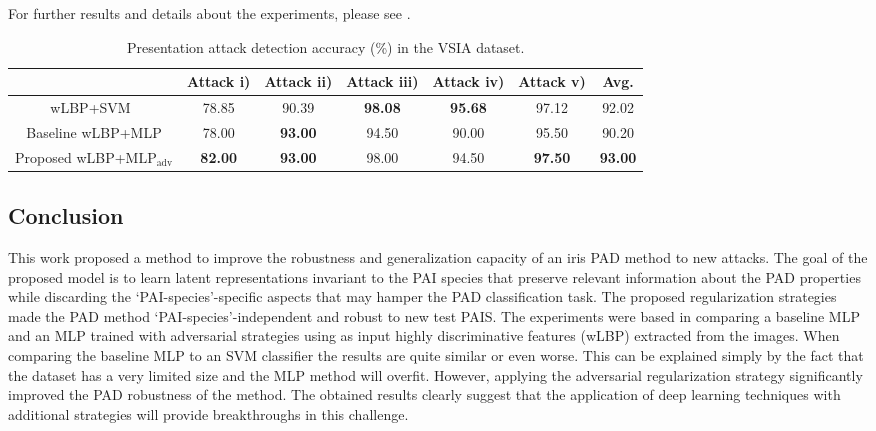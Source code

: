 For further results and details about the experiments, please see \citet{AdvInvAttack}.

\begin{table}[t]
    \centering
    \begin{small}
        \begin{tabular}{c|c c c c c:c}
            & Attack i)
            & Attack ii)
            & Attack iii)
            & Attack iv)
            & Attack v)
            & Avg. \\ \hline

            wLBP+SVM~\cite{sequeira2016realistic}
            &78.85     &90.39     &\bf 98.08 &\bf 95.68 & 97.12     & 92.02 \\
            Baseline wLBP+MLP
            &78.00     &\bf 93.00  &94.50    &90.00   &95.50     &90.20 \\
            Proposed wLBP+$\text{MLP}_\text{adv}$
            &\bf82.00  &\bf 93.00  &98.00   &94.50   &\bf 97.50  &\bf 93.00
        \end{tabular}
    \end{small}
    \caption{Presentation attack detection accuracy (\%) in the VSIA dataset.}
    \label{tab:pad_accuracy}
\end{table}

\subsection{Conclusion}
\label{sec:adv_iris_attack_conclusion}
This work proposed a method to improve the robustness and generalization capacity of an iris PAD method to new attacks. The goal of the proposed model is to learn latent representations invariant to the PAI species that preserve relevant information about the PAD properties while discarding the `PAI-species'-specific aspects that may hamper the PAD classification task. The proposed regularization strategies made the PAD method `PAI-species'-independent and robust to new test PAIS.
The experiments were based in comparing a baseline MLP and an MLP trained with adversarial strategies using as input highly discriminative features (wLBP) extracted from the images. When comparing the baseline MLP to an SVM classifier the results are quite similar or even worse. This can be explained simply by the fact that the dataset has a very limited size and the MLP method will overfit.
However, applying the adversarial regularization strategy significantly improved the PAD robustness of the method. The obtained results clearly suggest that the application of deep learning techniques with additional strategies will provide breakthroughs in this challenge.

